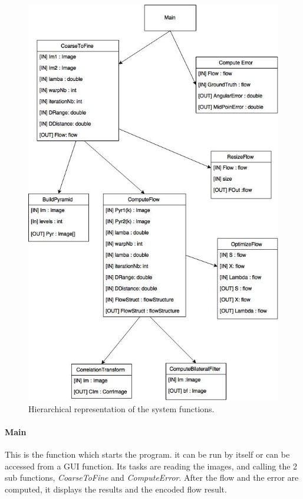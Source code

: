 \documentclass[12pt,a4paper,twoside]{report}
\begin{document}
{\begin{figure} \label{funcDiagram}
	\label{funcdiag}
	\centering
	\includegraphics[width = 6in]{img/functions} 
	\caption{Hierarchical representation of the system functions.}
\end{figure}

\paragraph{Main} This is the function which starts the program. it can be run by itself or can be accessed from a GUI function.
Its tasks are reading the images, and  calling the 2 sub functions, \textit{CoarseToFine} and \textit{ComputeError}. After the flow and the error are computed, it displays the results and the encoded flow result.

}
\end{document}
